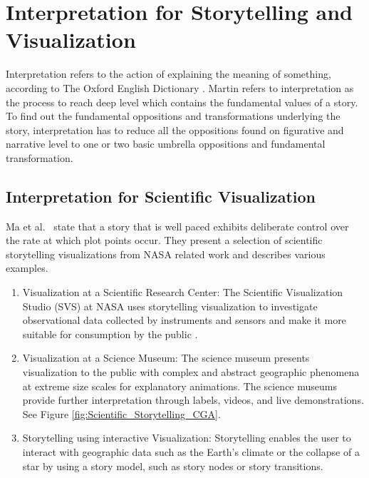 \documentclass{egpubl}
\begin{document}
\section{Interpretation for Storytelling and Visualization}
Interpretation refers to the action of explaining the meaning of something, according to The Oxford English Dictionary \cite{Interpretation}. Martin\cite{Martin1997} refers to interpretation as the process to reach deep level which contains the fundamental values of a story.  To find out the fundamental oppositions and transformations underlying the story, interpretation has to reduce all the oppositions found on figurative and narrative level to one or two basic umbrella oppositions and fundamental transformation.


\subsection{Interpretation for Scientific Visualization}
Ma et al.\ \cite{sci} state that a story that is well paced exhibits deliberate control over the rate at which plot points occur.
They present a selection of scientific storytelling visualizations from NASA related work and describes various examples.
\begin{enumerate}
\item Visualization at a Scientific Research Center: The Scientific Visualization Studio (SVS) at NASA uses storytelling visualization to investigate observational data collected by instruments and sensors and make it more suitable for consumption by the public \cite{nasa}\cite{svs1}.
\item Visualization at a Science Museum: The science museum presents visualization to the public with complex and abstract geographic phenomena at extreme size scales for explanatory animations. The science museums provide further interpretation through labels, videos, and live demonstrations. See Figure \ref{fig:Scientific_Storytelling_CGA}\cite{sci}.
\item Storytelling using interactive Visualization: Storytelling enables the user to interact with geographic data such as the Earth's climate or the collapse of a star by using a story model, such as story nodes or story transitions\cite{Akiba}.
\end{enumerate}
\end{document}
